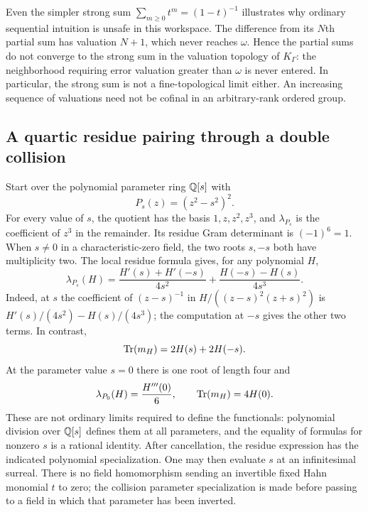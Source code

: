 \documentclass[11pt,letterpaper,oneside]{article}
\numberwithin{equation}{section}
\theoremstyle{definition}
\theoremstyle{remark}\newtheorem{remark}[theorem]{Remark}
\begin{document}
Even the simpler strong sum $\sum_{m\geq0}t^m=(1-t)^{-1}$ illustrates
why ordinary sequential intuition is unsafe in this workspace.
The difference from its $N$th partial sum has valuation $N+1$, which
never reaches $\omega$. Hence the partial sums do not converge to the
strong sum in the valuation topology of $K_\Gamma$: the neighborhood
requiring error valuation greater than $\omega$ is never entered.
In particular, the strong sum is not a fine-topological limit either.
An increasing sequence of valuations need not be cofinal in an
arbitrary-rank ordered group.

\subsection{A quartic residue pairing through a double collision}\label{subsec:quarticcollision}
Start over the polynomial parameter ring $\mathbb Q[s]$ with
\[
 P_s(z)=(z^2-s^2)^2.
\]
For every value of $s$, the quotient has the basis $1,z,z^2,z^3$,
and $\lambda_{P_s}$ is the coefficient of $z^3$ in the remainder.
Its residue Gram determinant is $(-1)^6=1$.
When $s\ne0$ in a characteristic-zero field, the two roots $s,-s$
both have multiplicity two. The local residue formula gives, for any
polynomial $H$,
\begin{equation}\label{eq:quarticcollisionresidue}
 \lambda_{P_s}(H)=
 \frac{H'(s)+H'(-s)}{4s^2}
 +\frac{H(-s)-H(s)}{4s^3}.
\end{equation}
Indeed, at $s$ the coefficient of $(z-s)^{-1}$ in
$H/((z-s)^2(z+s)^2)$ is $H'(s)/(4s^2)-H(s)/(4s^3)$;
the computation at $-s$ gives the other two terms. In contrast,
\[
 \operatorname{Tr}(m_H)=2H(s)+2H(-s).
\]
At the parameter value $s=0$ there is one root of length four and
\[
 \lambda_{P_0}(H)=\frac{H'''(0)}6,\qquad \operatorname{Tr}(m_H)=4H(0).
\]
These are not ordinary limits required to define the functionals:
polynomial division over $\mathbb Q[s]$ defines them at all parameters,
and the equality of formulas for nonzero $s$ is a rational identity.
After cancellation, the residue expression has the indicated polynomial
specialization. One may then evaluate $s$ at an infinitesimal surreal.
There is no field homomorphism sending an invertible fixed Hahn monomial
$t$ to zero; the collision parameter specialization is made before
passing to a field in which that parameter has been inverted.
\end{document}
